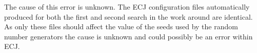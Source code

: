 The cause of this error is unknown.
The ECJ configuration files automatically produced for both the first and second search in the work around are identical.
As only these files should affect the value of the seeds used by the random number generators the cause is unknown and could possibly be an error within ECJ\cite{ecjtool}.


